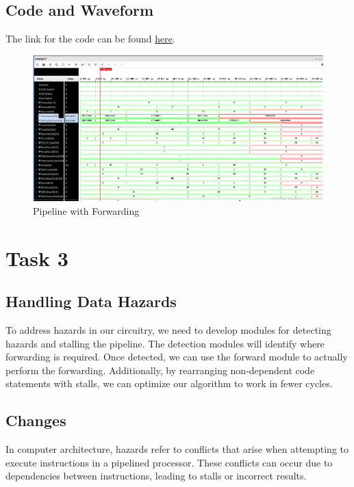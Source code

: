 \documentclass{report}
\theoremstyle{mytheoremstyle}
\theoremstyle{mytheoremstyle}
\theoremstyle{myproblemstyle}
\begin{document}
\subsection{Code and Waveform}
The link for the code can be found \href{https://github.com/AliMuhammadAsad/Computer-Architecture-Spring-23/tree/main/RISC_V%20Pipelined%20Processor}{here}.
\begin{figure}[h]
    \centering
    \includegraphics[scale = 0.40]{Pipeline_Forwarding_Hazarding.png}
    \caption{Pipeline with Forwarding}
    \label{fig: Pipeline with Forwarding}
\end{figure}

\section{Task 3}

\subsection{Handling Data Hazards}

To address hazards in our circuitry, we need to develop modules for detecting hazards and stalling the pipeline. The detection modules will identify where forwarding is required. Once detected, we can use the forward module to actually perform the forwarding. Additionally, by rearranging non-dependent code statements with stalls, we can optimize our algorithm to work in fewer cycles.

\subsection{Changes}

In computer architecture, hazards refer to conflicts that arise when attempting to execute instructions in a pipelined processor. These conflicts can occur due to dependencies between instructions, leading to stalls or incorrect results.
\end{document}
